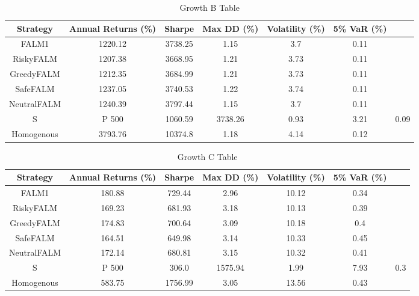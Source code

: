 

\begin{table}[]
    \centering
    \caption{Growth B Table}
    \begin{tabular}{|c|c|c|c|c|c|c|}
        \hline
        Strategy & Annual Returns (\%) & Sharpe & Max \ac{DD} (\%) & Volatility (\%)& 5\% \ac{VaR} (\%) \\
        \hline
        FALM1 & 1220.12 & 3738.25 & 1.15 & 3.7 & 0.11 \\
        RiskyFALM & 1207.38 & 3668.95 & 1.21 & 3.73 & 0.11 \\
        GreedyFALM & 1212.35 & 3684.99 & 1.21 & 3.73 & 0.11 \\
        SafeFALM & 1237.05 & 3740.53 & 1.22 & 3.74 & 0.11 \\
        NeutralFALM & 1240.39 & 3797.44 & 1.15 & 3.7 & 0.11 \\
        S&P 500 & 1060.59 & 3738.26 & 0.93 & 3.21 & 0.09 \\
        Homogenous & 3793.76 & 10374.8 & 1.18 & 4.14 & 0.12 \\
        \hline
    \end{tabular}
    \label{tab:growth_b_table}
\end{table}

\begin{table}[]
    \centering
    \caption{Growth C Table}
    \begin{tabular}{|c|c|c|c|c|c|c|}
        \hline
        Strategy & Annual Returns (\%) & Sharpe & Max \ac{DD} (\%) & Volatility (\%)& 5\% \ac{VaR} (\%) \\
        \hline
        FALM1 & 180.88 & 729.44 & 2.96 & 10.12 & 0.34 \\
        RiskyFALM & 169.23 & 681.93 & 3.18 & 10.13 & 0.39 \\
        GreedyFALM & 174.83 & 700.64 & 3.09 & 10.18 & 0.4 \\
        SafeFALM & 164.51 & 649.98 & 3.14 & 10.33 & 0.45 \\
        NeutralFALM & 172.14 & 680.81 & 3.15 & 10.32 & 0.41 \\
        S&P 500 & 306.0 & 1575.94 & 1.99 & 7.93 & 0.3 \\
        Homogenous & 583.75 & 1756.99 & 3.05 & 13.56 & 0.43 \\
        \hline
    \end{tabular}
    \label{tab:growth_c_table}
\end{table}

